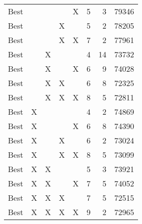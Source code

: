 \begin{tabular}{lllllrrr}
       Best &           &          &            &     X &         5 &               3 &      79346 \\
       Best &           &          &          X &       &         5 &               2 &      78205 \\
       Best &           &          &          X &     X &         7 &               2 &      77961 \\
       Best &           &        X &            &       &         4 &              14 &      73732 \\
       Best &           &        X &            &     X &         6 &               9 &      74028 \\
       Best &           &        X &          X &       &         6 &               8 &      72325 \\
       Best &           &        X &          X &     X &         8 &               5 &      72811 \\
       Best &         X &          &            &       &         4 &               2 &      74869 \\
       Best &         X &          &            &     X &         6 &               8 &      74390 \\
       Best &         X &          &          X &       &         6 &               2 &      73024 \\
       Best &         X &          &          X &     X &         8 &               5 &      73099 \\
       Best &         X &        X &            &       &         5 &               3 &      73921 \\
       Best &         X &        X &            &     X &         7 &               5 &      74052 \\
       Best &         X &        X &          X &       &         7 &               5 &      72515 \\
       Best &         X &        X &          X &     X &         9 &               2 &      72965 \\
\bottomrule
\end{tabular}
\unskip